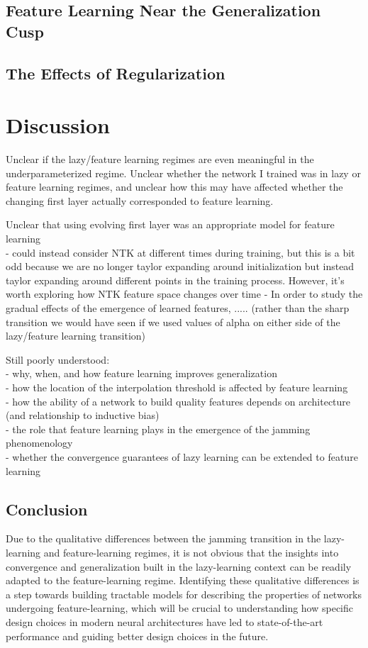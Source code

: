 \documentclass[a4paper, 12pt]{article}
\begin{document}
\subsection{Feature Learning Near the Generalization Cusp}
\subsection{The Effects of Regularization}

\section{Discussion}

Unclear if the lazy/feature learning regimes are even meaningful in the underparameterized regime.
Unclear whether the network I trained was in lazy or feature learning regimes, and unclear how this may have affected whether the changing first layer actually corresponded to feature learning.

Unclear that using evolving first layer was an appropriate model for feature learning\\
- could instead consider NTK at different times during training, but this is a bit odd because we are no longer taylor expanding around initialization but instead taylor expanding around different points in the training process. However, it's worth exploring how NTK feature space changes over time
- In order to study the gradual effects of the emergence of learned features, ..... (rather than the sharp transition we would have seen if we used values of alpha on either side of the lazy/feature learning transition)

Still poorly understood:\\

- why, when, and how feature learning improves generalization\\
- how the location of the interpolation threshold is affected by feature learning\\
- how the ability of a network to build quality features depends on architecture (and relationship to inductive bias) \\
- the role that feature learning plays in the emergence of the jamming phenomenology\\
- whether the convergence guarantees of lazy learning can be extended to feature learning

\subsection{Conclusion}

Due to the qualitative differences between the jamming transition in the lazy-learning and feature-learning regimes, it is not obvious that the insights into convergence and generalization built in the lazy-learning context can be readily adapted to the feature-learning regime. Identifying these qualitative differences is a step towards building tractable models for describing the properties of networks undergoing feature-learning, which will be crucial to understanding how specific design choices in modern neural architectures have led to state-of-the-art performance and guiding better design choices in the future.

\printbibliography
\end{document}
